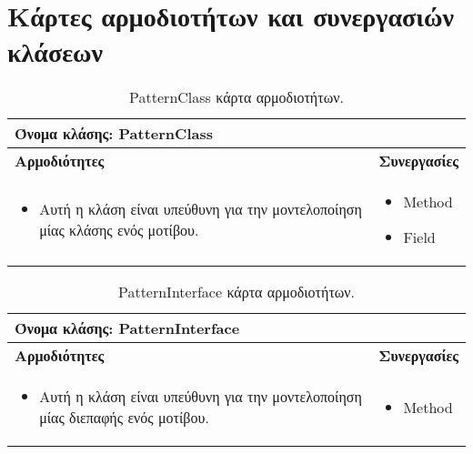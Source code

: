 \chapter{Κάρτες αρμοδιοτήτων και συνεργασιών κλάσεων}
\label{app:crc}

\begin{table}[H]
    \centering
    \begin{tabular}{|p{5cm}|p{5cm}|}
        \hline
        \multicolumn{2}{|l|}{Όνομα κλάσης: PatternClass} \\
        \hline
        \textbf{Αρμοδιότητες} & \textbf{Συνεργασίες} \\
        \hline
        \begin{itemize}
            \item Αυτή η κλάση είναι υπεύθυνη για την μοντελοποίηση μίας κλάσης ενός μοτίβου.
        \end{itemize} &   
        \begin{itemize}
            \item Method
            \item Field
        \end{itemize} \\
        \hline
    \end{tabular}
    \caption{PatternClass κάρτα αρμοδιοτήτων.}
    \label{tab:PatternClassCRC}
\end{table}
\begin{table}[H]
    \centering
    \begin{tabular}{|p{5cm}|p{5cm}|}
        \hline
        \multicolumn{2}{|l|}{Όνομα κλάσης: PatternInterface} \\
        \hline
        \textbf{Αρμοδιότητες} & \textbf{Συνεργασίες} \\
        \hline
        \begin{itemize}
            \item Αυτή η κλάση είναι υπεύθυνη για την μοντελοποίηση μίας διεπαφής ενός μοτίβου.
        \end{itemize} &   
        \begin{itemize}
            \item Method
        \end{itemize} \\
        \hline
    \end{tabular}
    \caption{PatternInterface κάρτα αρμοδιοτήτων.}
    \label{tab:PatternInterfaceCRC}
\end{table}
